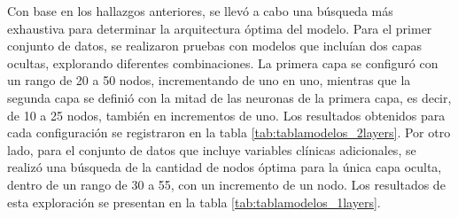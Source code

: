 Con base en los hallazgos anteriores, se llevó a cabo una búsqueda más exhaustiva para determinar la 
arquitectura óptima del modelo. Para el primer conjunto de datos, se realizaron pruebas con modelos 
que incluían dos capas ocultas, explorando diferentes combinaciones. La primera capa se configuró 
con un rango de 20 a 50 nodos, incrementando de uno en uno, mientras que la segunda capa se definió 
con la mitad de las neuronas de la primera capa, es decir, de 10 a 25 nodos, también en incrementos 
de uno. Los resultados obtenidos para cada configuración se registraron en la tabla \ref{tab:tablamodelos_2layers}. 
Por otro lado, para el conjunto de datos que incluye variables clínicas adicionales, se realizó una 
búsqueda de la cantidad de nodos óptima para la única capa oculta, dentro de un rango de 30 a 55, con un 
incremento de un nodo. Los resultados de esta exploración se presentan en la tabla \ref{tab:tablamodelos_1layers}.

